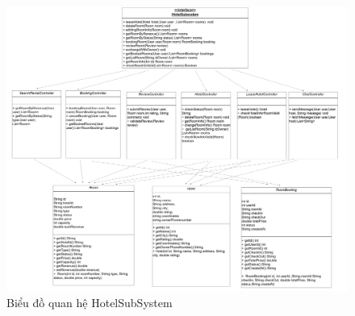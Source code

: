 \begin{figure}[H]
    \centering
    \includegraphics[width=\textwidth]{img3.5/hotel/newHotelSub.png} 
    \caption{Biểu đồ quan hệ HotelSubSystem}
\end{figure}

